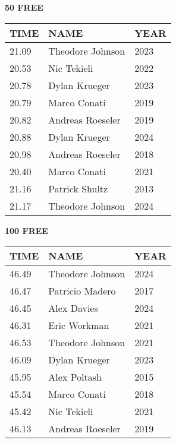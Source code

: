 \begin{minipage}[t]{0.48\textwidth}
\centering
\textbf{50 FREE}\\[0.05cm]
\begin{tabular}{@{}p{1.8cm}p{2.8cm}p{1.2cm}@{}}
\hline
\textbf{TIME} & \textbf{NAME} & \textbf{YEAR} \\
\hline
21.09 & Theodore Johnson & 2023 \\
20.53 & Nic Tekieli & 2022 \\
20.78 & Dylan Krueger & 2023 \\
20.79 & Marco Conati & 2019 \\
20.82 & Andreas Roeseler & 2019 \\
20.88 & Dylan Krueger & 2024 \\
20.98 & Andreas Roeseler & 2018 \\
20.40 & Marco Conati & 2021 \\
21.16 & Patrick Shultz & 2013 \\
21.17 & Theodore Johnson & 2024 \\
\hline
\end{tabular}
\end{minipage}\hfill
\begin{minipage}[t]{0.48\textwidth}
\centering
\textbf{100 FREE}\\[0.05cm]
\begin{tabular}{@{}p{1.8cm}p{2.8cm}p{1.2cm}@{}}
\hline
\textbf{TIME} & \textbf{NAME} & \textbf{YEAR} \\
\hline
46.49 & Theodore Johnson & 2024 \\
46.47 & Patricio Madero & 2017 \\
46.45 & Alex Davies & 2024 \\
46.31 & Eric Workman & 2021 \\
46.53 & Theodore Johnson & 2021 \\
46.09 & Dylan Krueger & 2023 \\
45.95 & Alex Poltash & 2015 \\
45.54 & Marco Conati & 2018 \\
45.42 & Nic Tekieli & 2021 \\
46.13 & Andreas Roeseler & 2019 \\
\hline
\end{tabular}
\end{minipage}

\vspace{0.4cm}

